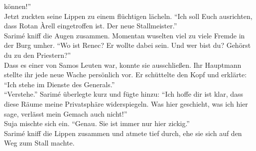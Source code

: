 können!''\\
Jetzt zuckten seine Lippen zu einem flüchtigen lächeln. ``Ich soll Euch ausrichten, dass Rotan 
Àrell eingetroffen ist. Der neue Stallmeister.''\\
Sarimé kniff die Augen zusammen. Momentan wuselten viel zu viele Fremde in der Burg umher. ``Wo ist 
Renec? Er wollte dabei sein. Und wer bist du? Gehörst du zu den Priestern?''\\
Dass es einer von Samos Leuten war, konnte sie ausschließen. Ihr Hauptmann stellte ihr jede neue 
Wache persönlich vor. Er schüttelte den Kopf und erklärte: ``Ich stehe im Dienste des Generals.''\\
``Verstehe.'' Sarimé überlegte kurz und fügte hinzu: ``Ich hoffe dir ist klar, dass diese Räume 
meine Privatsphäre widerspiegeln. Was hier geschieht, was ich hier sage, verlässt mein Gemach auch 
nicht!''\\
Suja mischte sich ein. ``Genau. Sie ist immer nur hier zickig.''\\
Sarimé kniff die Lippen zusammen und atmete tief durch, ehe sie sich auf den Weg zum Stall machte.\\

